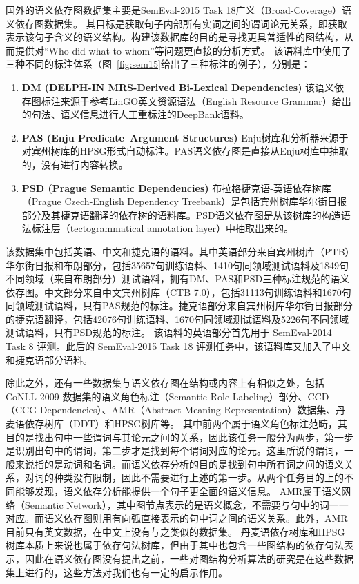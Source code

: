 国外的语义依存图数据集主要是SemEval-2015 Task 18广义（Broad-Coverage）语义依存图数据集。
其目标是获取句子内部所有实词之间的谓词论元关系，即获取表示该句子含义的语义结构。构建该数据库的目的是寻找更具普适性的图结构，从而提供对“Who did what to whom”等问题更直接的分析方式。
该语料库中使用了三种不同的标注体系（图~\ref{fig:sem15}给出了三种标注的例子），分别是：

\begin{enumerate}
	\item \textbf{DM (DELPH-IN MRS-Derived Bi-Lexical Dependencies)}
	该语义依存图标注来源于参考LinGO英文资源语法（English Resource Grammar）给出的句法、语义信息进行人工重标注的DeepBank语料。
	
	\item \textbf{PAS (Enju Predicate–Argument Structures)}
	Enju树库和分析器来源于对宾州树库的HPSG形式自动标注。PAS语义依存图是直接从Enju树库中抽取的，没有进行内容转换。
	
	\item \textbf{PSD (Prague Semantic Dependencies)}
	布拉格捷克语-英语依存树库（Prague Czech-English Dependency Treebank）是包括宾州树库华尔街日报部分及其捷克语翻译的依存树的语料库。PSD语义依存图是从该树库的构造语法标注层（tectogrammatical annotation layer）中抽取出来的。
\end{enumerate} 

该数据集中包括英语、中文和捷克语的语料。其中英语部分来自宾州树库（PTB）华尔街日报和布朗部分，包括35657句训练语料、1410句同领域测试语料及1849句不同领域（来自布朗部分）测试语料，拥有DM、PAS和PSD三种标注规范的语义依存图。中文部分来自中文宾州树库（CTB 7.0），包括31113句训练语料和1670句同领域测试语料，只有PAS规范的标注。捷克语部分来自宾州树库华尔街日报部分的捷克语翻译，包括42076句训练语料、1670句同领域测试语料及5226句不同领域测试语料，只有PSD规范的标注。 
该语料的英语部分首先用于 SemEval-2014 Task 8 评测\cite{oepen-EtAl:2014:SemEval}。此后的 SemEval-2015 Task 18 评测任务\cite{oepen-EtAl:2015:SemEval}中，该语料库又加入了中文和捷克语部分语料。

除此之外，还有一些数据集与语义依存图在结构或内容上有相似之处，包括 CoNLL-2009 数据集\cite{hajivc-EtAl:2009:CoNLL-2009-ST}的语义角色标注（Semantic Role Labeling）部分、CCD（CCG Dependencies）\cite{hockenmaier2007ccgbank}、AMR（Abstract Meaning Representation）数据集\cite{W13-2322}、丹麦语依存树库\cite{kromann2003danish}（DDT）和HPSG树库\cite{miyao2005corpus}等。
其中前两个属于语义角色标注范畴，其目的是找出句中一些谓词与其论元之间的关系，因此该任务一般分为两步，第一步是识别出句中的谓词，第二步才是找到每个谓词对应的论元。这里所说的谓词，一般来说指的是动词和名词。而语义依存分析的目的是找到句中所有词之间的语义关系，对词的种类没有限制，因此不需要进行上述的第一步。从两个任务目的上的不同能够发现，语义依存分析能提供一个句子更全面的语义信息。
AMR属于语义网络（Semantic Network），其中图节点表示的是语义概念，不需要与句中的词一一对应。而语义依存图则用有向弧直接表示的句中词之间的语义关系。此外，AMR目前只有英文数据，在中文上没有与之类似的数据集。
丹麦语依存树库和HPSG树库本质上来说也属于依存句法树库，但由于其中也包含一些图结构的依存句法表示，因此在语义依存图没有提出之前，一些对图结构分析算法的研究是在这些数据集上进行的，这些方法对我们也有一定的启示作用。


